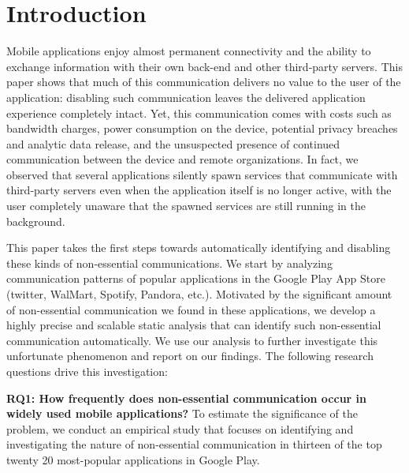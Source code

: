 \section{Introduction}
\label{sec:intro} 

Mobile applications enjoy almost permanent connectivity and the
ability to exchange information with their own back-end and other
third-party servers.  This paper shows that much of this communication
delivers no value to the user of the application: disabling such
communication leaves the delivered application experience completely
intact.  Yet, this communication comes with costs such as bandwidth
charges, power consumption on the device, potential privacy breaches
and analytic data release, and the unsuspected presence of continued
communication between the device and remote organizations. In fact, we
observed that several applications silently spawn services that
communicate with third-party servers even when the application itself
is no longer active, with the user completely unaware that the spawned
services are still running in the background. 

This paper takes the first steps towards automatically identifying and
disabling these kinds of non-essential communications. We start by
analyzing communication patterns of
popular applications in the Google Play App Store (twitter, WalMart,
Spotify, Pandora, etc.). Motivated by the significant
amount of non-essential communication we found in these applications, 
we develop a highly precise and scalable static analysis that can identify 
such non-essential communication automatically. We use our analysis to further 
investigate this unfortunate phenomenon and report on our findings. 
The following research questions drive this investigation:

\noindent 
{\bf RQ1: How frequently does non-essential communication occur in
  widely used mobile applications?}  To estimate the significance of
the problem, we conduct an empirical study that focuses on identifying
and investigating the nature of non-essential communication in thirteen of the 
top twenty 20 most-popular applications in Google Play.

